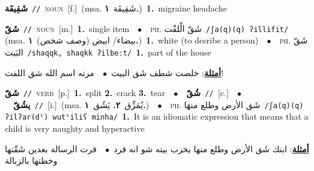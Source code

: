 \documentclass[10pt,a4paper,twoside]{article} %
\begin{document}
\begin{multicols}{2}
{\setlength\topsep{0pt}\textbf{\foreignlanguage{arabic}{شَقِيقَة}}\ {\color{gray}\texttt{//}\color{black}}\ \textsc{noun}\ [f.]\ \color{gray}(msa. \foreignlanguage{arabic}{شَقِيقَة}~\foreignlanguage{arabic}{\textbf{١.}})\color{black}\ \textbf{1.}~migraine headache\ } \vspace{2mm}

{\setlength\topsep{0pt}\textbf{\foreignlanguage{arabic}{شَقّ}}\ {\color{gray}\texttt{//}\color{black}}\ \textsc{noun}\ [m.]\ \textbf{1.}~single item\ \ $\bullet$\ \ \textsc{ph.} \color{gray} \foreignlanguage{arabic}{شَقّ الِّلفْت}\color{black}\ {\color{gray}\texttt{/{\sffamily ʃa(q)(q) ʔillifit}/}\color{black}}\ \color{gray} (msa. \foreignlanguage{arabic}{بيضاء/ ابيض (وصف شخص)}~\foreignlanguage{arabic}{\textbf{١.}})\color{black}\ \textbf{1.}~white (to desribe a person)\ \ $\bullet$\ \ \textsc{ph.} \color{gray} \foreignlanguage{arabic}{شَقّ البَيت}\color{black}\ {\color{gray}\texttt{/{\sffamily shaqqk, shaqkk ʔilbeːt}/}\color{black}}\ \textbf{1.}~part of the house\  \begin{flushright}\color{gray}\foreignlanguage{arabic}{\textbf{\underline{\foreignlanguage{arabic}{أمثلة}}}: خلصت شطف شَق البيت\ $\bullet$\ \  مرته اسم الله شق اللفت!}\end{flushright}\color{black}} \vspace{2mm}

{\setlength\topsep{0pt}\textbf{\foreignlanguage{arabic}{شَقّ}}\ {\color{gray}\texttt{//}\color{black}}\ \textsc{verb}\ [p.]\ \textbf{1.}~split  \textbf{2.}~crack  \textbf{3.}~tear\ \ $\bullet$\ \ \setlength\topsep{0pt}\textbf{\foreignlanguage{arabic}{شُقّ}}\ {\color{gray}\texttt{//}\color{black}}\ [c.]\ \ $\bullet$\ \ \setlength\topsep{0pt}\textbf{\foreignlanguage{arabic}{يشُقّ}}\ {\color{gray}\texttt{//}\color{black}}\ [i.]\ \color{gray}(msa. \foreignlanguage{arabic}{يُمَزِّق}~\foreignlanguage{arabic}{\textbf{٢.}}  \foreignlanguage{arabic}{يَشُق}~\foreignlanguage{arabic}{\textbf{١.}})\color{black}\ \ $\bullet$\ \ \textsc{ph.} \color{gray} \foreignlanguage{arabic}{شَق الأرض وطلع منهَا}\color{black}\ {\color{gray}\texttt{/{\sffamily ʃa(q)(q) ʔilʔar(dˤ) wutˤiliʕ minha}/}\color{black}}\ \textbf{1.}~It is an idiomatic expression that means that a child is very naughty and hyperactive\  \begin{flushright}\color{gray}\foreignlanguage{arabic}{\textbf{\underline{\foreignlanguage{arabic}{أمثلة}}}: ابنك شَق الأرض وطلع منها يخرب بيته شو انه قرد\ $\bullet$\ \  قرت الرسالة بعدين شَقّتها وخطتها بالزبالة}\end{flushright}\color{black}} \vspace{2mm}


\end{multicols}
\end{document}

